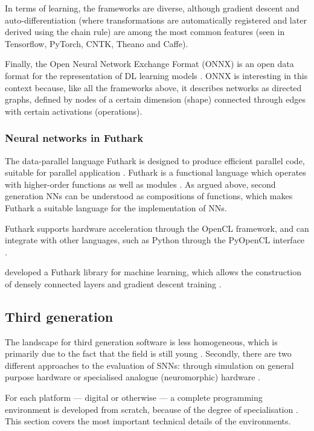 \documentclass[report.tex]{subfiles}
\begin{document}
In terms of learning, the frameworks are diverse, although gradient descent 
and auto-differentiation (where transformations are automatically registered and 
later derived using the chain rule) are among the most common features 
(seen in Tensorflow, PyTorch, CNTK, Theano and Caffe). 

Finally, the Open Neural Network Exchange Format (ONNX) is an open data format for the representation
of \gls{DL} learning models \cite{ONNX2018}. 
ONNX is interesting in this context because, like all the frameworks above, it describes 
networks as directed graphs, defined by nodes of a certain dimension (shape) connected through
edges with certain activations (operations).

\subsubsection{Neural networks in Futhark}
The data-parallel language Futhark is designed to produce efficient parallel
code, suitable for parallel application \cite{Henriksen2017, Elsman2018}.
Futhark is a functional language which operates with higher-order functions as
well as modules \cite{Elsman2018b, Hovgaard2018}.
As argued above, second generation \glspl{NN} can be understood as compositions
of functions, which makes Futhark a suitable language for the implementation of
\glspl{NN}. 

Futhark supports hardware acceleration through the \gls{OpenCL} framework,
and can integrate with other languages, such as \gls{Python} through the
PyOpenCL interface \cite{PyOpenCL}.

\citeauthor{Minh2018} developed a Futhark library for machine learning, which 
allows the construction of densely connected layers and gradient descent
training \cite{Minh2018}.

\subsection{Third generation}
The landscape for third generation software is less homogeneous, which is
primarily due to the fact that the field is still young \cite{Maass1997,
Albeda2018}.
Secondly, there are two different approaches to the evaluation of \glspl{SNN}:
through simulation on general purpose hardware or specialised analogue
(neuromorphic) hardware \cite{Maass1997, Davison2009, Albada2018}.

For each platform --- digital or otherwise --- a complete programming environment
is developed from scratch, because of the degree of specialisation
\cite{Walter2015, Lin2018}.
This section covers the most important technical details of
the environments.
\end{document}
